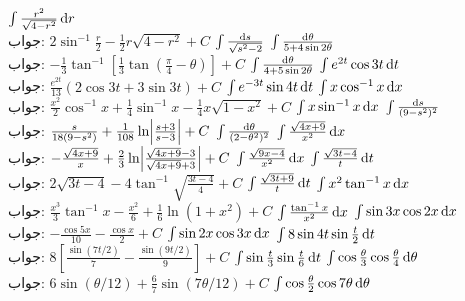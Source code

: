$\int \frac{r^2}{\sqrt{4-r^2}}\dif r$\\
جواب:\quad
$2\sin^{-1}\tfrac{r}{2}-\tfrac{1}{2}r\sqrt{4-r^2}+C$
$\int \frac{\dif s}{\sqrt{s^2-2}}$
$\int\frac{\dif \theta}{5+4\sin 2\theta}$\\
جواب:\quad
$-\tfrac{1}{3}\tan^{-1}[\tfrac{1}{3}\tan(\tfrac{\pi}{4}-\theta)]+C$
$\int \frac{\dif \theta}{4+5\sin 2\theta}$
$\int e^{2t}\cos 3t \dif t$\\
جواب:\quad
$\tfrac{e^{2t}}{13}(2\cos 3t+3\sin 3t)+C$
$\int e^{-3t}\sin 4t\dif t$
$\int x \cos^{-1} x\dif x$\\
جواب:\quad
$\tfrac{x^2}{2}\cos^{-1}x+\tfrac{1}{4}\sin^{-1}x-\tfrac{1}{4}x\sqrt{1-x^2}+C$
$\int x\sin^{-1}x\dif x$
$\int\frac{\dif s}{(9-s^2)^2}$\\
جواب:\quad
$\tfrac{s}{18(9-s^2)}+\tfrac{1}{108}\ln\abs{\tfrac{s+3}{s-3}}+C$
$\int \frac{\dif \theta}{(2-\theta^2)^2}$
$\int \frac{\sqrt{4x+9}}{x^2}\dif x$\\
جواب:\quad
$-\tfrac{\sqrt{4x+9}}{x}+\tfrac{2}{3}\ln\abs{\tfrac{\sqrt{4x+9}-3}{\sqrt{4x+9}+3}}+C$
$\int\frac{\sqrt{9x-4}}{x^2}\dif x$
$\int\frac{\sqrt{3t-4}}{t}\dif t$\\
جواب:\quad
$2\sqrt{3t-4}-4\tan^{-1}\sqrt{\tfrac{3t-4}{4}}+C$
$\int\frac{\sqrt{3t+9}}{t}\dif t$
$\int x^2\tan^{-1}x\dif x$\\
جواب:\quad
$\tfrac{x^3}{3}\tan^{-1}x-\tfrac{x^2}{6}+\tfrac{1}{6}\ln(1+x^2)+C$
$\int \frac{\tan^{-1}x}{x^2}\dif x$
$\int \sin 3x\cos 2x\dif x$\\
جواب:\quad
$-\tfrac{\cos5x}{10}-\tfrac{\cos x}{2}+C$
$\int \sin 2x\cos 3x\dif x$
$\int 8\sin 4t\sin\frac{t}{2}\dif t$\\
جواب:\quad
$8[\tfrac{\sin(7t/2)}{7}-\tfrac{\sin(9t/2)}{9}]+C$
$\int \sin\frac{t}{3}\sin \frac{t}{6}\dif t$
$\int \cos\frac{\theta}{3}\cos\frac{\theta}{4}\dif \theta$\\
جواب:\quad
$6\sin(\theta/12)+\tfrac{6}{7}\sin(7\theta/12)+C$
$\int \cos\frac{\theta}{2}\cos 7\theta \dif \theta$

